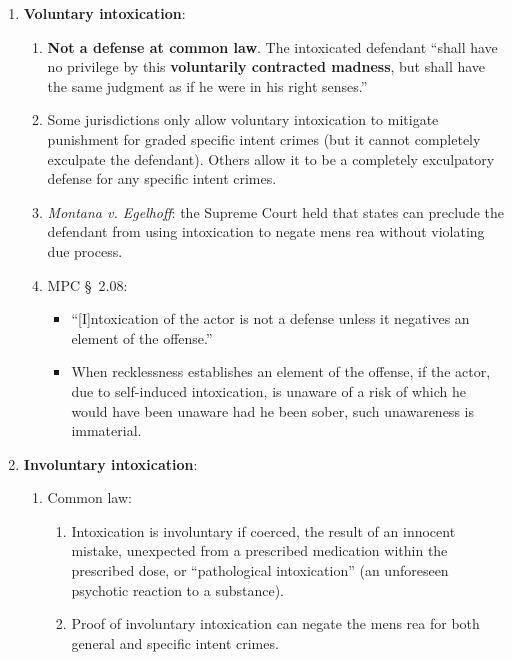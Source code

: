 \begin{enumerate}
    \item \textbf{Voluntary intoxication}:
        \begin{enumerate}
            \item \textbf{Not a defense at common law}. The intoxicated 
            defendant ``shall have no privilege by this \textbf{voluntarily 
            contracted madness}, but shall have the same judgment as if he 
            were in his right senses.''
            \item Some jurisdictions only allow voluntary intoxication to mitigate 
            punishment for graded specific intent crimes (but it cannot 
            completely exculpate the defendant). Others allow it to be a 
            completely exculpatory defense for any specific intent crimes.
            \item \emph{Montana v. Egelhoff}: the Supreme Court held that 
            states can preclude the defendant from using intoxication to 
            negate mens rea without violating due process.
            \item MPC \S\ 2.08:
            \begin{itemize}
                \item ``[I]ntoxication of the actor is not a defense unless it 
                negatives an element of the offense.''
                \item When recklessness establishes an element of the offense, if the 
                actor, due to self-induced intoxication, is unaware of a risk of which 
                he would have been unaware had he been sober, such unawareness is 
                immaterial.
            \end{itemize}
        \end{enumerate}
    \item \textbf{Involuntary intoxication}:
    \begin{enumerate}
        \item Common law:
        \begin{enumerate}
            \item Intoxication is involuntary if coerced, the result of an 
            innocent mistake, unexpected from a prescribed medication within 
            the prescribed dose, or ``pathological intoxication'' (an 
            unforeseen psychotic reaction to a substance). 
            \item Proof of involuntary intoxication can negate the mens rea 
            for both general and specific intent crimes.

\end{enumerate}
\end{enumerate}
\end{enumerate}
